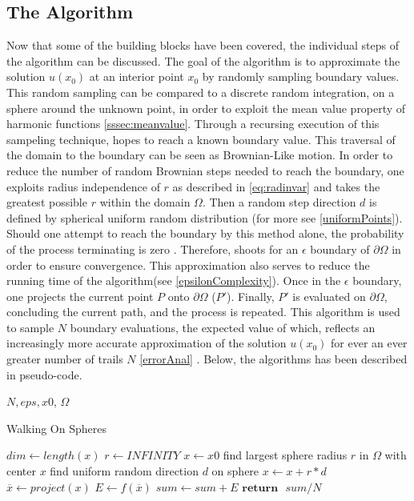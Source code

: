 \subsection{The Algorithm}\label{sssec:algorithm} %
Now that some of the building blocks have been covered, the individual steps of
the algorithm can be discussed.  The goal of the algorithm is to approximate
the solution $u(x_{0})$ at an interior point $x_{0}$ by randomly sampling boundary
values.  This random sampling can be compared to a discrete random integration,
on a sphere around the unknown point, in order to exploit the mean value property
of harmonic functions \ref{sssec:meanvalue}.  Through a recursing execution of this sampeling
technique, hopes to reach a known boundary value.   This traversal of
 the domain to the boundary can be seen as  Brownian-Like motion.
In order to reduce the number of random Brownian steps needed to reach the boundary,
one exploits radius independence of $r$ as described in \ref{eq:radinvar} and takes
the greatest possible $r$ within the domain $\Omega$.  Then a random step direction $d$
is defined by spherical uniform random distribution (for more see \ref{uniformPoints}).
Should one attempt to reach the boundary by this method alone, the probability of the
process terminating is zero \cite{kakutani1944, DeLaurentis, Bornemann}.  Therefore, shoots for an
$\epsilon$ boundary of $\partial \Omega$ in order to ensure convergence. This approximation also
serves to reduce the running time of the algorithm(see \ref{epsilonComplexity}). Once in the $\epsilon$
boundary, one projects the current point $P$ onto $\partial \Omega$ ($P'$).  Finally,
$P'$ is evaluated on $\partial \Omega$, concluding the current path, and the process
is repeated.
This algorithm is used to sample $N$ boundary evaluations, the expected value of which,
reflects an increasingly more accurate approximation of the solution $u(x_{0})$
for ever an ever greater number of trails $N$ \ref{errorAnal} \cite{Bornemann,DeLaurentis}.  Below, the algorithms has been
described in pseudo-code.
 \begin{algorithm}[H]{$N, eps, x0$, $\Omega$}
  \caption{Walking On Spheres}
 \label{alg:wos}
\begin{algorithmic}[1]
   \State $dim \gets length(x)$ 
   \State $ r \gets INFINITY$
   \label{lst:line:for}
   \State $x \leftarrow x0$
      \State find largest sphere radius $r$ in $\Omega$ with center $x$ \label{lst:line:radius}
      \State find uniform random direction $d$ on sphere \label{lst:line:direction}
      \State $ x \gets x + r * d$ 
 \EndWhile
 \State $\overline x \gets project(x)$ 
 \State $E \gets f(\overline x)$ 
 \State $sum \gets sum + E$  \label{lst:line:reduce}
  \EndFor
 \State $\textbf{return} \text{ } sum / N$ 

\end{algorithmic}
\end{algorithm}


